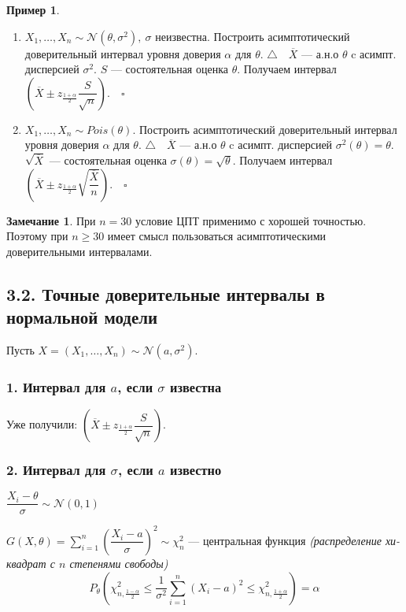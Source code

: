 \documentclass[12pt]{report}
\theoremstyle{definition}
\newtheorem{example}{Пример}
\newtheorem{remark}{Замечание}
\begin{document}
\begin{example}
	$\;$
	\begin{enumerate}
		\item  $X_1, \dots, X_n \sim \mathcal{N}(\theta, \sigma^2), \ \sigma$ неизвестна. Построить асимптотический доверительный интервал уровня доверия $\alpha$ для $\theta$.
		$\triangle \quad \overline{X}$ — а.н.о $\theta$ c асимпт. дисперсией $\sigma^2$. $S$ — состоятельная оценка $\theta$. Получаем интервал $\left(\overline{X} \pm z_{\frac{1+\alpha}{2}}\dfrac{S}{\sqrt{n}}\right). \quad \square$ 
		\item $X_1, \dots, X_n \sim Pois(\theta)$. Построить асимптотический доверительный интервал уровня доверия $\alpha$ для $\theta$.  
		$\triangle \quad \overline{X}$ — а.н.о $\theta$ c асимпт. дисперсией $\sigma^2(\theta) = \theta$. $\sqrt{\overline{X}}$ — состоятельная оценка $\sigma(\theta) = \sqrt{\theta}.$ Получаем интервал $\left(\overline{X} \pm z_{\frac{1+\alpha}{2}}\sqrt{\dfrac{\overline{X}}{n}}\right). \quad \square$ 
	\end{enumerate}
\end{example}
\begin{remark}
	При $n=30$ условие ЦПТ применимо с хорошей точностью. Поэтому при $n \geqslant 30$ имеет смысл пользоваться асимптотическими доверительными интервалами.
\end{remark}

\subsection{3.2. Точные доверительные интервалы в нормальной модели}

Пусть $X = (X_1, \dots, X_n) \sim \mathcal{N}(a, \sigma^2).$
\subsubsection{1. Интервал для $a$, если $\sigma$ известна}
Уже получили: $\left(\overline{X} \pm z_{\frac{1+\alpha}{2}}\dfrac{S}{\sqrt{n}}\right)$.

\subsubsection{2. Интервал для $\sigma$, если $a$ известно}

$\dfrac{X_i - \theta}{\sigma} \sim \mathcal{N}(0, 1)$

$G(X, \theta) = \sum\limits_{i=1}^n\left(\dfrac{X_i - a}{\sigma}\right)^2 \sim \chi^2_n$ — центральная функция \emph{(распределение хи-квадрат с $n$ степенями свободы)}
$$ P_\theta\left(\chi^2_{n, \frac{1-\alpha}{2}} \leqslant \dfrac{1}{\sigma^2}\sum_{i=1}^n (X_i - a)^2 \leqslant \chi^2_{n, \frac{1+\alpha}{2}} \right) = \alpha $$
\end{document}
